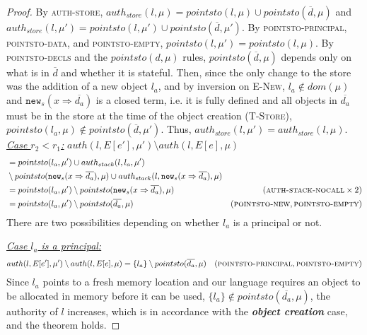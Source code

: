 \documentclass{llncs}
\newcommand{\keywadj}[1]{\mathtt{#1}}
\begin{document}
\begin{proof}
By \textsc{auth-store}, $auth_{store}(l, \mu) = pointsto(l, \mu) \cup pointsto(\overline{d}, \mu)$ and $auth_{store}(l, \mu') = pointsto(l, \mu') \cup pointsto(\overline{d}, \mu')$. By \textsc{pointsto-principal}, \textsc{pointsto-data}, and \textsc{pointsto-empty}, $pointsto(l, \mu') = pointsto(l, \mu)$. By \textsc{pointsto-decls} and the $pointsto(d, \mu)$ rules, $pointsto(\overline{d}, \mu)$ depends only on what is in $\overline{d}$ and whether it is stateful. Then, since the only change to the store was the addition of a new object $l_a$, and by inversion on \textsc{E-New}, $l_a \not\in dom(\mu)$ and $\keywadj{new}_s(x \Rightarrow \overline{d_a})$ is a closed term, i.e. it is fully defined and all objects in $\overline{d_a}$ must be in the store at the time of the object creation (\textsc{T-Store}), $pointsto(l_a, \mu) \not\in pointsto(\overline{d}, \mu')$. Thus, $auth_{store}(l, \mu') = auth_{store}(l, \mu)$.\\

\noindent\underline{\underline{\textit{Case $r_2 < r_1$:}}}
\noindent$auth(l, E[e'], \mu') \setminus auth(l, E[e], \mu)$
\vspace{-7pt}
\begin{align*}
&= pointsto(l_a, \mu') \cup auth_{stack}(l, l_a, \mu')\\
& \setminus pointsto(\keywadj{new}_s(x \Rightarrow \overline{d_a}), \mu) \cup auth_{stack}(l, \keywadj{new}_s(x \Rightarrow \overline{d_a}), \mu)\\
&= pointsto(l_a, \mu') \setminus pointsto(\keywadj{new}_s(x \Rightarrow \overline{d_a}), \mu) & (\textsc{auth-stack-nocall} \times 2)\\
&= pointsto(l_a, \mu') \setminus pointsto(\overline{d_a}, \mu) & (\textsc{pointsto-new}, \textsc{pointsto-empty})
\end{align*}
There are two possibilities depending on whether $l_a$ is a principal or not.

\noindent\underline{\textit{Case $l_a$ is a principal:}}
\vspace{-7pt}
\begin{align*}
auth(l, E[e'], \mu') \setminus auth(l, E[e], \mu) &= \{ l_a \} \setminus pointsto(\overline{d_a}, \mu) & (\textsc{pointsto-principal}, \textsc{pointsto-empty}) 
\end{align*}
Since $l_a$ points to a fresh memory location and our language requires an object to be allocated in memory before it can be used, $\{ l_a \} \not\in pointsto(\overline{d_a}, \mu)$, the authority of $l$ increases, which is in accordance with the \textbf{\textit{object creation}} case, and the theorem holds.


\end{proof}
\end{document}
